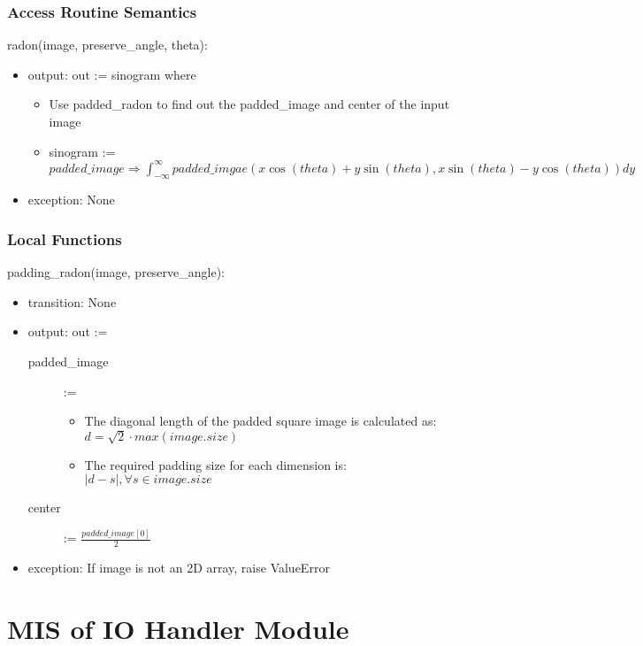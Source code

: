 \documentclass[12pt, titlepage]{article}
\begin{document}
\subsubsection{Access Routine Semantics}


\noindent
radon(image, preserve\_angle, theta):
\begin{itemize}
\item output: out := sinogram where
\begin{itemize}
    \item Use padded\_radon to find out the padded\_image and center of the input
      image
      \item sinogram := \(padded\_image \Rightarrow \int_{-\infty}^{\infty} padded\_imgae(x\cos(theta) + y\sin(theta),
        x\sin(theta) - y\cos(theta))dy\)
\end{itemize}
\item exception: None
\end{itemize}

\subsubsection{Local Functions}
\noindent
padding\_radon(image, preserve\_angle):
\begin{itemize}
\item transition: None
\item output: out :=
  \begin{description}
    \item[padded\_image] :=
      \begin{itemize}
      \item The diagonal length of the padded square image is calculated as:
        \(d = \sqrt{2}\cdot max(image.size)\)
      \item The required padding size for each dimension is: \(|d - s|, \forall s \in image.size\)
      \end{itemize}
    \item[center] := \(\frac{padded\_image[0]}{2}\)
  \end{description}
\item exception: If image is not an 2D array, raise ValueError
\end{itemize}

\newpage
\section{MIS of IO Handler Module} \label{Module}
\end{document}
